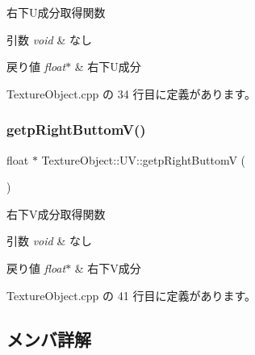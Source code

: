 右下\+U成分取得関数 


\begin{DoxyParams}{引数}
{\em void} & なし \\
\hline
\end{DoxyParams}

\begin{DoxyRetVals}{戻り値}
{\em float$\ast$} & 右下\+U成分 \\
\hline
\end{DoxyRetVals}


 Texture\+Object.\+cpp の 34 行目に定義があります。

\mbox{\label{class_texture_object_1_1_u_v_aec258407da09ac45c626be3ba1b33103}} 
\subsubsection{\texorpdfstring{getp\+Right\+Buttom\+V()}{getpRightButtomV()}}
{\footnotesize\ttfamily float $\ast$ Texture\+Object\+::\+U\+V\+::getp\+Right\+ButtomV (\begin{DoxyParamCaption}{ }\end{DoxyParamCaption})}



右下\+V成分取得関数 


\begin{DoxyParams}{引数}
{\em void} & なし \\
\hline
\end{DoxyParams}

\begin{DoxyRetVals}{戻り値}
{\em float$\ast$} & 右下\+V成分 \\
\hline
\end{DoxyRetVals}


 Texture\+Object.\+cpp の 41 行目に定義があります。



\subsection{メンバ詳解}
\mbox{\label{class_texture_object_1_1_u_v_aa1db937c69b68f578130bd03954d1d3f}} 
